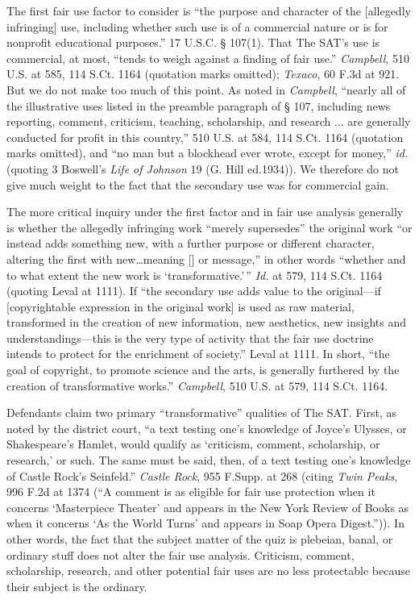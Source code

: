 The first fair use factor to consider is ``the purpose and character of the
[allegedly infringing] use, including whether such use is of a commercial
nature or is for nonprofit educational purposes.'' 17 U.S.C. {\S} 107(1). That
The SAT's use is commercial, at most, ``tends to weigh against a finding of
fair use.'' \emph{Campbell}, 510 U.S. at 585, 114 S.Ct. 1164 (quotation marks
omitted); \emph{Texaco}, 60 F.3d at 921. But we do not make too much of this
point. As
noted in \emph{Campbell}, ``nearly all of the illustrative uses listed in the
preamble
paragraph of {\S} 107, including news reporting, comment, criticism, teaching,
scholarship, and research ... are generally conducted for profit in this
country,'' 510 U.S. at 584, 114 S.Ct. 1164 (quotation marks omitted), and ``no
man but a blockhead ever wrote, except for money,'' \emph{id.} (quoting 3
Boswell's \emph{Life of Johnson} 19 (G. Hill ed.1934)). We therefore do not give
much weight to the fact that the secondary use was for commercial gain.

The more critical inquiry under the first factor and in fair use analysis
generally is whether the allegedly infringing work ``merely supersedes'' the
original work ``or instead adds something new, with a further purpose or
different character, altering the first with new\ldots meaning [] or message,''
in other words ``whether and to what extent the new work is
`transformative.'\,'' \emph{Id.} at 579, 114 S.Ct. 1164 (quoting Leval
at 1111). If ``the secondary use adds value to the original---if
[copyrightable expression in the original work] is used as raw material,
transformed in the creation of new information, new aesthetics, new insights
and understandings---this is the very type of activity that the fair use
doctrine intends to protect for the enrichment of society.'' Leval at 1111. In
short, ``the goal of copyright, to promote science and the arts, is generally
furthered by the creation of transformative works.'' \emph{Campbell}, 510 U.S.
at 579,
114 S.Ct. 1164.

Defendants claim two primary ``transformative'' qualities of The SAT. First, as
noted by the district court, ``a text testing one's knowledge of Joyce's
Ulysses, or Shakespeare's Hamlet, would qualify as `criticism,
comment, scholarship, or research,' or such. The same must be said, then, of a
text testing one's knowledge of Castle Rock's Seinfeld.'' \emph{Castle Rock},
955
F.Supp. at 268 (citing \emph{Twin Peaks}, 996 F.2d at 1374 (``A comment is as
eligible
for fair use protection when it concerns `Masterpiece Theater'
and appears in the New York Review of Books as when it concerns
`As the World Turns' and appears in Soap Opera Digest.'')). In
other words, the fact that the subject matter of the quiz is plebeian, banal,
or ordinary stuff does not alter the fair use analysis. Criticism, comment,
scholarship, research, and other potential fair uses are no less protectable
because their subject is the ordinary.

